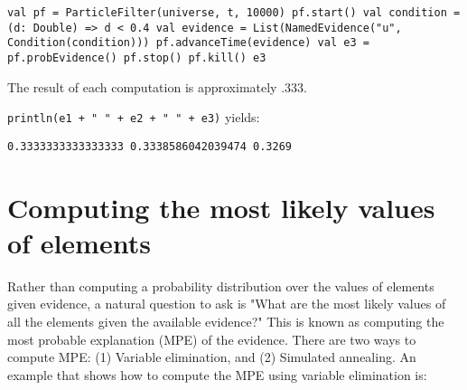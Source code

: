 \begin{flushleft}
    \texttt{val pf = ParticleFilter(universe, t, 10000)
    \newline pf.start()
    \newline val condition = (d: Double) => d < 0.4
    \newline val evidence = List(NamedEvidence("u", Condition(condition)))
    \newline pf.advanceTime(evidence)
    \newline val e3 = pf.probEvidence()
    \newline pf.stop()
    \newline pf.kill()
    \newline e3
  }
\end{flushleft}

The result of each computation is approximately .333. 

\texttt{println(e1 + " " + e2 + " " + e3)} yields:

\begin{flushleft}
    \texttt{0.3333333333333333 0.3338586042039474 0.3269}
\end{flushleft}


\section{Computing the most likely values of elements}

Rather than computing a probability distribution over the values of elements given evidence, a natural question to ask is "What are the most likely values of all the elements given the available evidence?" This is known as computing the most probable explanation (MPE) of the evidence. There are two ways to compute MPE: (1) Variable elimination, and (2) Simulated annealing. An example that shows how to compute the MPE using variable elimination is:

